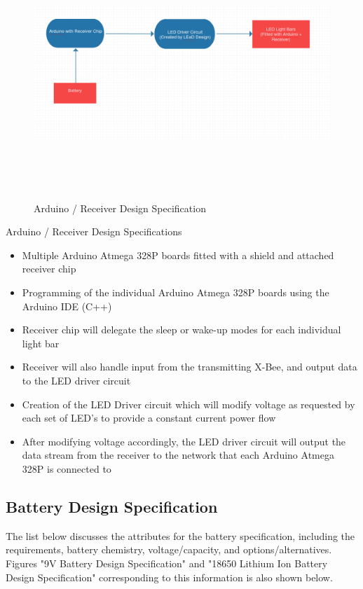 \documentclass[12pt]{article}
\begin{document}
{{	\begin{figure}[!htb]
		\centering
		\includegraphics[width = 140mm, height = 95mm]{assets/Arduino_Receiver_Diagram.png}
		\caption{Arduino / Receiver Design Specification \label{overflow}}
	\end{figure}
	
	\indent
	Arduino / Receiver Design Specifications
	\begin{itemize}
		\item Multiple Arduino Atmega 328P boards fitted with a shield and   						  attached receiver chip 
		\item Programming of the individual Arduino Atmega 328P boards using the 					  Arduino IDE (C++)
		\item Receiver chip will delegate the sleep or wake-up modes for each 					  individual light bar
		\item Receiver will also handle input from the transmitting X-Bee, and output 			  data to the LED driver circuit
		\item Creation of the LED Driver circuit which will modify voltage as 						  requested by each set of LED’s to provide a constant current power flow
		\item After modifying voltage accordingly, the LED driver circuit will output 			  the data stream from the receiver to the network that each Arduino 					  Atmega 328P is connected to
	\end{itemize}

	\subsection{Battery Design Specification}
	The list below discusses the attributes for the battery specification, including the requirements, battery chemistry, voltage/capacity, and options/alternatives. Figures "9V Battery Design Specification" and "18650 Lithium Ion Battery Design Specification" corresponding to this information is also shown below.
	
}}
\end{document}
